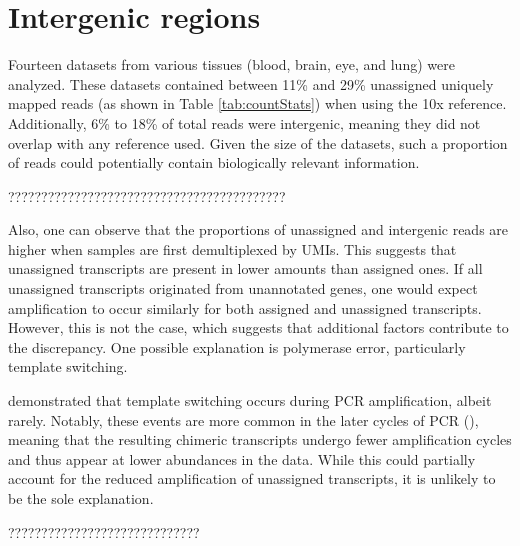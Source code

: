 \section{Intergenic regions}

Fourteen datasets from various tissues (blood, brain, eye, and lung) were analyzed.
These datasets contained between 11\% and 29\% unassigned uniquely mapped reads (as shown in Table \ref{tab:countStats})
when using the 10x reference.
Additionally, 6\% to 18\% of total reads were intergenic, meaning they did not overlap with any reference used.
Given the size of the datasets, such a proportion of reads could potentially contain biologically relevant information.

??????????????????????????????????????????

Also, one can observe that the proportions of unassigned and intergenic reads are higher when samples are first demultiplexed by UMIs.
This suggests that unassigned transcripts are present in lower amounts than assigned ones.
If all unassigned transcripts originated from unannotated genes,
one would expect amplification to occur similarly for both assigned and unassigned transcripts.
However, this is not the case, which suggests that additional factors contribute to the discrepancy.
One possible explanation is polymerase error, particularly template switching.

\textcite{Kebschull2015} demonstrated that template switching occurs during PCR amplification, albeit rarely.
Notably, these events are more common in the later cycles of PCR (\cite{Kebschull2015}),
meaning that the resulting chimeric transcripts undergo fewer amplification cycles and thus appear at lower abundances in the data.
While this could partially account for the reduced amplification of unassigned transcripts, it is unlikely to be the sole explanation.

?????????????????????????????



